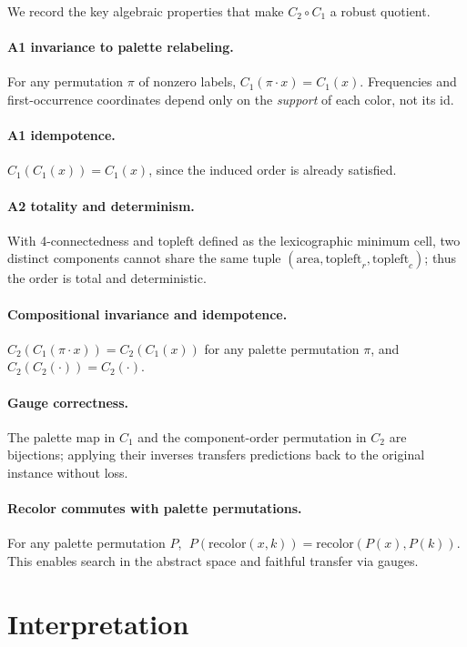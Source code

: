 \documentclass[11pt]{article}
\begin{document}
We record the key algebraic properties that make $C_2\!\circ C_1$ a robust quotient.

\paragraph{A1 invariance to palette relabeling.}
For any permutation $\pi$ of nonzero labels, $C_1(\pi\!\cdot\!x)=C_1(x)$. Frequencies and first-occurrence coordinates depend only on the \emph{support} of each color, not its id.

\paragraph{A1 idempotence.}
$C_1(C_1(x))=C_1(x)$, since the induced order is already satisfied.

\paragraph{A2 totality and determinism.}
With 4-connectedness and $\mathrm{topleft}$ defined as the lexicographic minimum cell, two distinct components cannot share the same tuple $(\mathrm{area},\mathrm{topleft}_r,\mathrm{topleft}_c)$; thus the order is total and deterministic.

\paragraph{Compositional invariance and idempotence.}
$C_2(C_1(\pi\!\cdot\!x))=C_2(C_1(x))$ for any palette permutation $\pi$, and $C_2(C_2(\cdot))=C_2(\cdot)$.

\paragraph{Gauge correctness.}
The palette map in $C_1$ and the component-order permutation in $C_2$ are bijections; applying their inverses transfers predictions back to the original instance without loss.

\paragraph{Recolor commutes with palette permutations.}
For any palette permutation $P$, \(\;P(\mathrm{recolor}(x,k))=\mathrm{recolor}(P(x),P(k))\). This enables search in the abstract space and faithful transfer via gauges.

\section{Interpretation}
\end{document}
